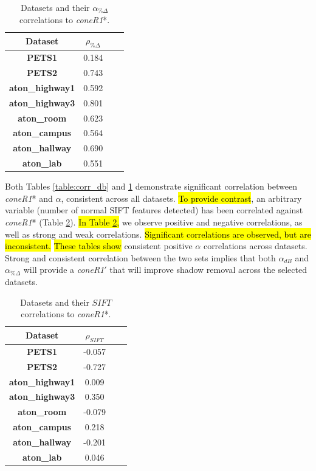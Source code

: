 \begin{table}
\centering
\begin{tabular}{ |c|c|c|c| }
	\hline
	\textbf{Dataset} & \textbf{$\rho_{\%\Delta}$} \\
	\hline
	\hline
	\textbf{PETS1} & 0.184 \\
	\hline
	\textbf{PETS2} & 0.743 \\
	\hline
	\textbf{aton\_highway1} & 0.592 \\
	\hline
	\textbf{aton\_highway3} & 0.801 \\
	\hline
	\textbf{aton\_room} & 0.623 \\
	\hline
	\textbf{aton\_campus} & 0.564 \\
	\hline
	\textbf{aton\_hallway} & 0.690 \\
	\hline
	\textbf{aton\_lab} & 0.551 \\
	\hline
\end{tabular}
\caption{Datasets and their $\alpha_{\%\Delta}$ correlations to \textit{coneR1}*.}
\label{table:corr_rgb}
\end{table}

Both Tables \ref{table:corr_db} and \ref{table:corr_rgb} demonstrate significant correlation between \textit{coneR1}* and $\alpha$, consistent across all datasets. \hl{To provide contrast}, an arbitrary variable (number of normal SIFT features detected) has been correlated against \textit{coneR1}* (Table \ref{table:bad_corr}). \hl{In Table \ref{table:bad_corr},} we observe positive and negative correlations, as well as strong and weak correlations.  \hl{Significant correlations are observed, but are inconsistent.} \hl{These tables show} consistent positive $\alpha$ correlations across datasets. Strong and consistent correlation between the two sets implies that both $\alpha_{dB}$ and $\alpha_{\%\Delta}$ will provide a \textit{coneR1}$'$ that will improve shadow removal across the selected datasets.

\begin{table}
\centering
\begin{tabular}{ |c|c|c|c| }
	\hline
	\textbf{Dataset} & \textbf{$\rho_{SIFT}$} \\
	\hline
	\hline
	\textbf{PETS1} & -0.057 \\
	\hline
	\textbf{PETS2} & -0.727 \\
	\hline
	\textbf{aton\_highway1} & 0.009 \\
	\hline
	\textbf{aton\_highway3} & 0.350 \\
	\hline
	\textbf{aton\_room} & -0.079 \\
	\hline
	\textbf{aton\_campus} & 0.218 \\
	\hline
	\textbf{aton\_hallway} & -0.201 \\
	\hline
	\textbf{aton\_lab} & 0.046 \\
	\hline
\end{tabular}
\caption{Datasets and their $SIFT$ correlations to \textit{coneR1}*.}
\label{table:bad_corr}
\end{table}

